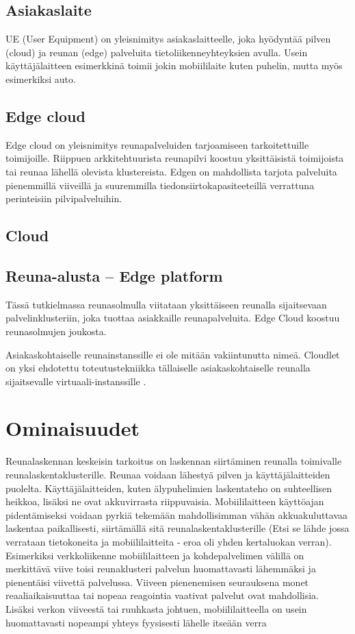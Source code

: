 \documentclass[finnish]{tktltiki2}
\theoremstyle{definition}
\theoremstyle{remark}
\begin{document}
\subsection{Asiakaslaite}
UE (User Equipment) on yleisnimitys asiakaslaitteelle, joka hyödyntää pilven (cloud) ja reunan (edge) palveluita tietoliikenneyhteyksien avulla.
Usein käyttäjälaitteen esimerkkinä toimii jokin mobiililaite kuten puhelin, mutta myös esimerkiksi auto. 

\subsection{Edge cloud}
Edge cloud on yleisnimitys reunapalveluiden tarjoamiseen tarkoitettuille toimijoille.
Riippuen arkkitehtuurista reunapilvi koostuu yksittäisistä toimijoista tai reunaa lähellä olevista klustereista.
Edgen on mahdollista tarjota palveluita pienemmillä viiveillä ja suuremmilla tiedonsiirtokapasiteeteillä verrattuna perinteisiin pilvipalveluihin. 

\subsection{Cloud}

\subsection{Reuna-alusta – Edge platform}

Tässä tutkielmassa reunasolmulla viitataan yksittäiseen reunalla sijaitsevaan
palvelinklusteriin, joka tuottaa asiakkaille reunapalveluita. Edge Cloud koostuu reunasolmujen joukosta.

Asiakaskohtaiselle reunainstanssille ei ole mitään vakiintunutta nimeä.
Cloudlet on yksi ehdotettu toteutustekniikka tällaiselle asiakaskohtaiselle reunalla sijaitsevalle virtuaali-instanssille \cite{satya09}.




\section{Ominaisuudet}

Reunalaskennan keskeisin tarkoitus on laskennan siirtäminen reunalla toimivalle reunalaskentaklusterille. Reunaa voidaan lähestyä pilven ja käyttäjälaitteiden puolelta. Käyttäjälaitteiden, kuten älypuhelimien laskentateho on suhteellisen heikkoa, lisäksi ne ovat akkuvirrasta riippuvaisia. 
Mobiililaitteen käyttöajan pidentämiseksi voidaan pyrkiä tekemään mahdollisimman vähän akkuakuluttavaa laskentaa paikallisesti, siirtämällä sitä reunalaskentaklusterille (Etsi se lähde jossa verrataan tietokoneita ja mobiililaitteita - eroa oli yhden kertaluokan verran).
Esimerkiksi verkkoliikenne mobiililaitteen ja kohdepalvelimen välillä on merkittävä viive toisi reunaklusteri palvelun huomattavasti lähemmäksi ja pienentäisi viivettä palvelussa. Viiveen pienenemisen seurauksena monet reaaliaikaisuuttaa tai nopeaa reagointia vaativat palvelut ovat mahdollisia. Lisäksi verkon viiveestä tai ruuhkasta johtuen, mobiililaitteella on usein huomattavasti nopeampi yhteys fyysisesti lähelle itseään verra
\end{document}
